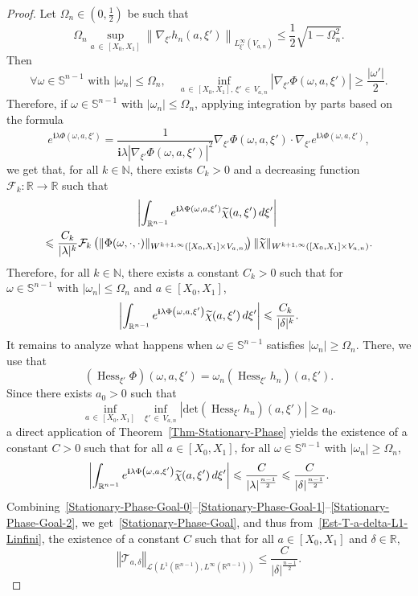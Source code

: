 \documentclass[AHL,Unicode,longabstracts]{cedram}
\newcommand{\scL}{\mathscr{L}}
\newcommand{\scT}{\mathscr{T}}
\newcommand*\R{\mathbb{R}}
\newcommand*\N{\mathbb{N}}
\renewcommand*\S{\mathbb{S}}
\renewcommand{\i}{\mathbf{i}}
\newcommand{\clF}{\mathcal{F}}
\newcommand{\norm}[1]{\left\Vert#1\right\Vert}
\renewcommand{\leq}{\leqslant}
\renewcommand{\geq}{\geqslant}
\renewcommand{\tilde}{\widetilde}
\DeclareMathOperator{\Hess}{Hess}
\let\oldtilde\tilde
\renewcommand*{\tilde}[1]{\mathchoice{\widetilde{#1}}{\widetilde{#1}}{\oldtilde{#1}}{\oldtilde{#1}}}
\let\oldforall\forall
\renewcommand*{\forall}{\mathrel{\oldforall}}
\begin{document}
\begin{proof}
Let $\Omega_n \in (0,\frac{1}{2})$ be such that
\[
\Omega_n \sup_{a\, \in\,[X_0, X_1]}
\left\| \nabla_{\xi'} h_n(a,\xi')\right\|_{L^\infty_{\xi'}(V_{a,n})}
\leq
\frac{1}{2} \sqrt{1 - \Omega_n^2}.
\]
Then
\[
\forall \omega \in \S^{n-1} \text{ with } |\omega_n| \leq \Omega_n,
\quad
\inf_{a\, \in\,[X_0, X_1], \, \xi'\,\in \,V_{a,n}} \left|\nabla_{\xi'} \Phi(\omega,a,\xi')\right| \geq \frac{|\omega'|}{2}.
\]
Therefore, if $\omega \in \S^{n-1}$ with $|\omega_n| \leq \Omega_n$, applying integration by parts based on the formula
\[
e^{\i \lambda \Phi(\omega, a, \xi')} =
\frac{1}{\i \lambda |\nabla_{\xi'} \Phi(\omega,a,\xi')|^2} \nabla_{\xi'} \Phi\left(\omega,a,\xi'\right) \cdot \nabla_{\xi'} e^{\i \lambda \Phi(\omega, a, \xi')},
\]
we get that, for all $k \in \N$, there exists $C_k>0$ and a decreasing function $\clF_k: \R \to \R$ such that
\begin{multline*}
\!\!\left|
\int_{\R^{n-1}} e^{\i \lambda \Phi(\omega, a, \xi')} \tilde \chi(a,\xi') \, d \xi'
\right|
\\
\leq 
\frac{C_k}{|\lambda|^k } \clF_k\left(\| \Phi (\omega, \cdot, \cdot) \|_{W^{k+1,\infty}\left([X_0,X_1] \times V_{a,n}\right)}\!\right) \|\tilde \chi \|_{W^{k+1,\infty}\left([X_0,X_1] \times V_{a,n}\right)}.
\end{multline*}
Therefore, for all $k \in \N$, there exists a constant $C_k>0$ such that for $\omega \in \S^{n-1} \text{ with } |\omega_n| \leq \Omega_n$ and $a \in [X_0, X_1]$,
\begin{equation}\label{Stationary-Phase-Goal-1}
\left|
\int_{\R^{n-1}} e^{\i \lambda \Phi\left(\omega, a, \xi'\right)} \tilde \chi(a,\xi') \, d \xi'
\right|
\leq
\frac{C_k}{|\delta|^k}.
\end{equation}
It remains to analyze what happens when $\omega \in \S^{n-1}$ satisfies $|\omega_n| \geq \Omega_n$. There, we use that
\[
\left(\Hess_{\xi'} \Phi\right)(\omega, a, \xi') = \omega_n \left(\Hess_{\xi'} h_n\right)(a,\xi').
\]
Since there exists $a_0 >0$ such that
\[
\inf_{a\, \in\,[X_0,X_1]}\; \inf_{\xi'\,\in\,V_{a,n}} \left|\text{det} \left(\Hess_{\xi'} h_n\right)(a, \xi') \right| \geq a_0.
\]
a direct application of Theorem~\ref{Thm-Stationary-Phase} yields the existence of a constant $C>0$ such that for all $a \in [X_0, X_1]$, for all $\omega \in \S^{n-1}$ with $|\omega_n | \geq \Omega_n$,
\begin{equation}\label{Stationary-Phase-Goal-2}
\left|
\int_{\R^{n-1}} e^{\i \lambda \Phi\left(\omega, a, \xi'\right)} \tilde \chi(a,\xi') \, d \xi'
\right|
\leq
\frac{C}{|\lambda|^{\frac{n-1}{2}}}
\leq
\frac{C}{|\delta|^{\frac{n-1}{2}}}.
\end{equation}
Combining~\eqref{Stationary-Phase-Goal-0}--\eqref{Stationary-Phase-Goal-1}--\eqref{Stationary-Phase-Goal-2}, we get~\eqref{Stationary-Phase-Goal}, and thus from~\eqref{Est-T-a-delta-L1-Linfini}, the existence of a constant $C$ such that for all $a \in [X_0, X_1]$ and $\delta \in \R$,
\begin{equation}\label{Est-T-a-delta-L1-Linfini-Final}
\norm{
\scT_{a,\delta} }_{\scL\left(L^{1}\left(\R^{n-1}\right), L^\infty\left(\R^{n-1}\right)\right)}
\leq
\frac{C}{|\delta|^{\frac{n-1}{2}}}.
\end{equation}


\end{proof}
\end{document}
